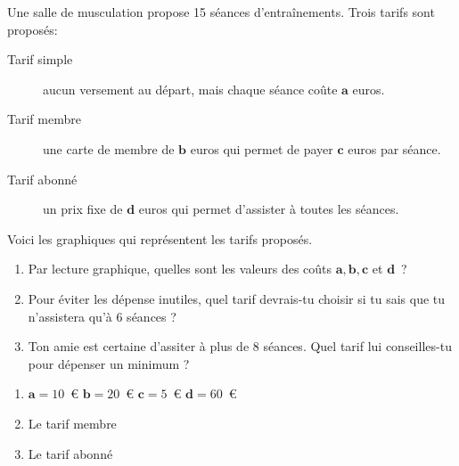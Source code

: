 \documentclass[a4paper, 12pt, parskip=half-]{scrartcl}
\begin{document}
\newpage
\begin{exercise}[points=4]
    Une salle de musculation propose 15 séances d'entraînements.
    Trois tarifs sont proposés:
    \begin{description}
        \item[Tarif simple] aucun versement au départ, mais chaque séance coûte $\bm{a}$ euros.
        \item[Tarif membre] une carte de membre de $\bm{b}$ euros qui permet de payer $\bm{c}$ euros par séance.
        \item[Tarif abonné] un prix fixe de $\bm{d}$ euros qui permet d'assister à toutes les séances.
    \end{description}
    Voici les graphiques qui représentent les tarifs proposés.
    \begin{center}
        
    \end{center}
    \begin{enumerate}
        \item Par lecture graphique, quelles sont les valeurs des coûts $\bm{a}, \bm{b}, \bm{c}$ et $\bm{d}$~?
        \item Pour éviter les dépense inutiles, quel tarif devrais-tu choisir si tu sais que tu n'assistera qu'à 6 séances ?
        \item Ton amie est certaine d'assiter à plus de 8 séances. Quel tarif lui conseilles-tu pour dépenser un minimum ?
    \end{enumerate}
\end{exercise}
\begin{solution}
    \begin{enumerate}
        \item $\bm{a} = 10$~€\hfill
              $\bm{b} = 20$~€\hfill
              $\bm{c} = 5$~€\hfill
              $\bm{d} = 60$~€
        \item Le tarif membre
        \item Le tarif abonné
    \end{enumerate}
\end{solution}
\newpage
\printsolutions
\end{document}
